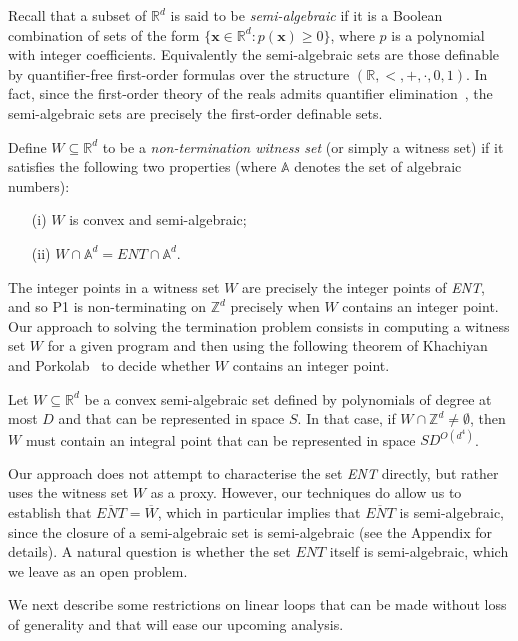 Recall that a subset of $\mathbb{R}^d$ is said to be
\emph{semi-algebraic} if it is a Boolean combination of sets of the
form $\{ \boldsymbol{x} \in \mathbb{R}^d : p(\boldsymbol{x})\geq 0\}$,
where $p$ is a polynomial with integer coefficients.  Equivalently the
semi-algebraic sets are those definable by quantifier-free first-order
formulas over the structure $(\mathbb{R},<,+,\cdot,0,1)$.  In fact,
since the first-order theory of the reals admits quantifier
elimination~\cite{Tar51}, the semi-algebraic sets are precisely the
first-order definable sets.

Define $W \subseteq \mathbb{R}^d$ to be a
\emph{non-termination witness set} (or simply a witness set) if it
satisfies the following two properties (where $\mathbb{A}$ denotes the
set of algebraic numbers):
\begin{itemize}
\item[(i)] $W$ is convex and semi-algebraic;
\item[(ii)] $W\cap \mathbb{A}^d=\mathit{ENT}\cap \mathbb{A}^d$.
\end{itemize}

The integer points in a witness set $W$ are precisely the integer
points of \textit{ENT}, and so \textsf{P1} is non-terminating on
$\mathbb{Z}^d$ precisely when $W$ contains an integer point.  Our
approach to solving the termination problem consists in computing a
witness set $W$ for a given program and then using the following
theorem of Khachiyan and Porkolab~\cite{KhachiyanP97} to decide whether $W$
contains an integer point.
\begin{theorem}
Let $W\subseteq\mathbb{R}^d$ be a convex semi-algebraic set defined by
polynomials of degree at most $D$ and that can be represented in space
$S$. In that case, if $W\cap\mathbb{Z}^d\neq\emptyset$, then $W$ must
contain an integral point that can be represented in space
$SD^{O(d^4)}$.
\end{theorem}

Our approach does not attempt to characterise the set \textit{ENT}
directly, but rather uses the witness set $W$ as a proxy. However, our
techniques do allow us to establish that
$\overline{\mathit{ENT}}=\overline{W}$, which in particular implies
that $\overline{\mathit{ENT}}$ is semi-algebraic, since the closure of
a semi-algebraic set is semi-algebraic (see the Appendix for
details). A natural question is whether the set $ENT$
itself is semi-algebraic, which we leave as an open problem.

We next describe some restrictions on linear loops that can
be made without loss of generality and that will ease our upcoming
analysis.

